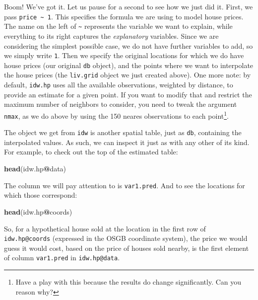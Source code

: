 \documentclass[
]{book}
\newenvironment{Shaded}{\begin{snugshade}}{\end{snugshade}}
\newcommand{\KeywordTok}[1]{\textcolor[rgb]{0.13,0.29,0.53}{\textbf{#1}}}
\newcommand{\NormalTok}[1]{#1}
\newcommand{\OperatorTok}[1]{\textcolor[rgb]{0.81,0.36,0.00}{\textbf{#1}}}
\begin{document}
Boom! We've got it. Let us pause for a second to see how we just did it. First, we pass \texttt{price\ \textasciitilde{}\ 1}. This specifies the formula we are using to model house prices. The name on the left of \texttt{\textasciitilde{}} represents the variable we want to explain, while everything to its right captures the \emph{explanatory} variables. Since we are considering the simplest possible case, we do not have further variables to add, so we simply write \texttt{1}. Then we specify the original locations for which we do have house prices (our original \texttt{db} object), and the points where we want to interpolate the house prices (the \texttt{liv.grid} object we just created above). One more note: by default, \texttt{idw.hp} uses all the available observations, weighted by distance, to provide an estimate for a given point. If you want to modify that and restrict the maximum number of neighbors to consider, you need to tweak the argument \texttt{nmax}, as we do above by using the 150 neares observations to each point\footnote{Have a play with this because the results do change significantly. Can you reason why?}.

The object we get from \texttt{idw} is another spatial table, just as \texttt{db}, containing the interpolated values. As such, we can inspect it just as with any other of its kind. For example, to check out the top of the estimated table:

\begin{Shaded}
\begin{Highlighting}[]
\KeywordTok{head}\NormalTok{(idw.hp}\OperatorTok{@}\NormalTok{data)}
\end{Highlighting}
\end{Shaded}

The column we will pay attention to is \texttt{var1.pred}. And to see the locations for which those correspond:

\begin{Shaded}
\begin{Highlighting}[]
\KeywordTok{head}\NormalTok{(idw.hp}\OperatorTok{@}\NormalTok{coords)}
\end{Highlighting}
\end{Shaded}

So, for a hypothetical house sold at the location in the first row of \texttt{idw.hp@coords} (expressed in the OSGB coordinate system), the price we would guess it would cost, based on the price of houses sold nearby, is the first element of column \texttt{var1.pred} in \texttt{idw.hp@data}.
\end{document}
